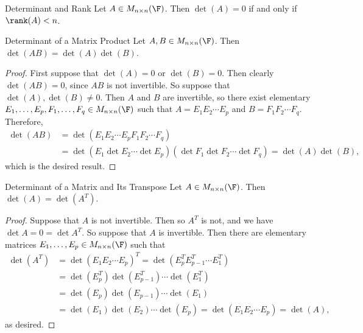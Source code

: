 \documentclass[linearalgebraI]{subfiles}
\begin{document}
    \begin{cor}{Determinant and Rank}
        Let $A\in M_{n\times n}(\F)$. Then $\det(A) = 0$ if and only if $\rank(A)<n$.
    \end{cor}	

    \begin{prop}{Determinant of a Matrix Product}
        Let $A, B\in M_{n\times n}(\F)$. Then $\det(AB) = \det(A)\det(B)$.
    \end{prop}

    \begin{proof}
        First suppose that $\det(A) = 0$ or $\det(B) = 0$. Then clearly $\det(AB) = 0$, since $AB$ is not invertible. So suppose that $\det(A), \det(B)\neq 0$. Then $A$ and $B$ are invertible, so there exist elementary $E_1, \ldots, E_p, F_1, \ldots, F_q\in M_{n\times n}(\F)$ such that $A = E_1E_2\cdots E_p$ and $B = F_1F_2 \cdots F_q$. Therefore,
        \begin{align*}
            \det (AB) & = \det \left( E_1E_2\cdots E_pF_1F_2\cdots F_q \right) \\
                      & = \det \left( E_1\det E_2\cdots \det E_p \right) \left( \det F_1\det F_2\cdots \det F_q \right) = \det(A)\det(B),
        \end{align*} 
        which is the desired result.
    \end{proof}

    \begin{prop}{Determinant of a Matrix and Its Transpose}
        Let $A\in M_{n\times n}(\F)$. Then $\det(A) = \det \left( A^T \right)$.
    \end{prop}

    \begin{proof}
        Suppose that $A$ is not invertible. Then so $A^T$ is not, and we have $\det A = 0 = \det A^T$. So suppose that $A$ is invertible. Then there are elementary matrices $E_1, \ldots, E_p\in M_{n\times n}(\F)$ such that
        \begin{align*}
           \det(A^T) & = \det \left( E_1E_2\cdots E_p \right)^T = \det \left( E_p^TE_{p-1}^T\cdots E_1^T \right) \\
                     & = \det \left( E_p^T \right) \det \left(E_{p-1}^T\right) \cdots \det \left( E_1^T \right) \\
                     & = \det (E_p) \det (E_{p-1}) \cdots \det (E_1) \\
                     & = \det(E_1) \det(E_2) \cdots \det(E_p) = \det \left( E_1E_2\cdots E_p \right) = \det (A),
        \end{align*} 
        as desired.
    \end{proof}
\end{document}
